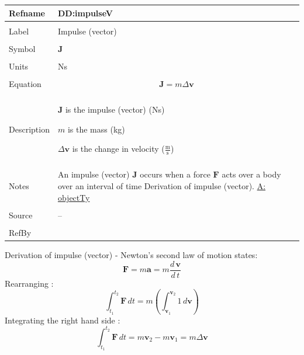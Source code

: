 \documentclass[12pt]{article}
\begin{document}
\noindent \begin{minipage}{\textwidth}
\begin{tabular}{p{} p{}}
\toprule \textbf{Refname} & \textbf{DD:impulseV}
\label{DD:impulseV}
\\ \midrule \\
Label & Impulse (vector)
\\ \midrule \\
Symbol & $\mathbf{J}$
\\ \midrule \\
Units & Ns
\\ \midrule \\
Equation & \begin{displaymath}
           \mathbf{J}=m Δ\mathbf{v}
           \end{displaymath}
\\ \midrule \\
Description & \begin{symbDescription}
              \item{$\mathbf{J}$ is the impulse (vector) (Ns)}
              \item{$m$ is the mass (kg)}
              \item{$Δ\mathbf{v}$ is the change in velocity ($\frac{\text{m}}{\text{s}}$)}
              \end{symbDescription}
\\ \midrule \\
Notes & An impulse (vector) $\mathbf{J}$ occurs when a force $\mathbf{F}$ acts over a body over an interval of time Derivation of impulse (vector).
        \hyperref[assumpOT]{A: objectTy}
\\ \midrule \\
Source & --
\\ \midrule \\
RefBy & 
\\ \bottomrule \end{tabular}
\end{minipage}
Derivation of impulse (vector) - Newton's second law of motion states:
\begin{displaymath}
\mathbf{F}=m \mathbf{a}=m \frac{d\,\mathbf{v}}{d\,t}
\end{displaymath}
Rearranging :
\begin{displaymath}
\int_{{t_{1}}}^{{t_{2}}}{\mathbf{F}}\,dt=m \left(\int_{{\mathbf{v}_{1}}}^{{\mathbf{v}_{2}}}{1}\,d\mathbf{v}\right)
\end{displaymath}
Integrating the right hand side :
\begin{displaymath}
\int_{{t_{1}}}^{{t_{2}}}{\mathbf{F}}\,dt=m {\mathbf{v}_{2}}-m {\mathbf{v}_{1}}=m Δ\mathbf{v}
\end{displaymath}
\par~
\end{document}
